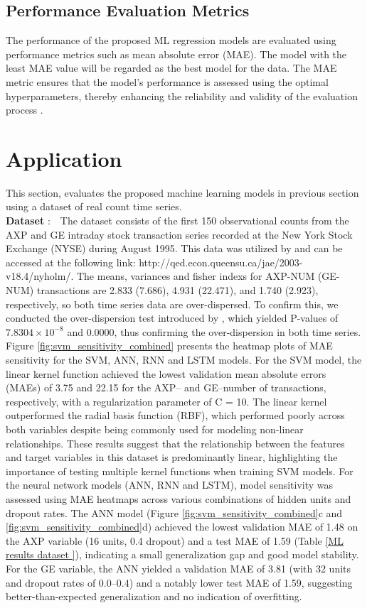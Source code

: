 \documentclass[twoside]{article}
\begin{document}
\subsection{Performance Evaluation Metrics} \label{Performance Evaluation Metrics}
The performance of the proposed ML regression models are evaluated using performance metrics such as  mean absolute error (MAE).
The model with the least MAE value will be regarded as the best model for the data. The MAE metric ensures that the model’s performance is assessed using the optimal hyperparameters, thereby enhancing the reliability and validity of the evaluation process \cite{Alomair : 2024}.
\section{Application}%
This section,  evaluates the proposed machine learning models in previous section using   a dataset of real count time series.\\
{\bf Dataset }:~~The dataset consists of the first 150 observational counts from the AXP and GE intraday stock transaction series recorded at the New York Stock Exchange (NYSE) during August 1995. This data was utilized by \cite{Nyholm : 2003} and can be accessed at the following link: http://qed.econ.queensu.ca/jae/2003-v18.4/nyholm/. The means, variances  and fisher indexs for AXP-NUM (GE-NUM) transactions are 2.833 (7.686), 4.931 (22.471), and 1.740 (2.923), respectively, so both time series data are over-dispersed.  To confirm this, we conducted the over-dispersion test introduced by \cite{Schweer : 2014}, which yielded P-values of $7.8304 \times 10^{-8}$ and $0.0000$, thus confirming the over-dispersion in both time series.\\
Figure \ref{fig:svm_sensitivity_combined} presents the heatmap plots of MAE sensitivity for the SVM, ANN, RNN  and LSTM models. For the SVM model, the linear kernel function achieved the lowest validation mean absolute errors (MAEs) of 3.75 and 22.15 for the AXP– and GE–number of transactions, respectively, with a regularization parameter of C = 10. The linear kernel outperformed the radial basis function (RBF), which performed poorly across both variables despite being commonly used for modeling non-linear relationships. These results suggest that the relationship between the features and target variables in this dataset is predominantly linear, highlighting the importance of testing multiple kernel functions when training SVM models. For the neural network models (ANN, RNN  and LSTM), model sensitivity was assessed using MAE heatmaps across various combinations of hidden units and dropout rates. The ANN model (Figure \ref{fig:svm_sensitivity_combined}c and \ref{fig:svm_sensitivity_combined}d) achieved the lowest validation MAE of 1.48 on the AXP variable (16 units, 0.4 dropout) and a test MAE of 1.59 (Table \ref{ML results dataset }), indicating a small generalization gap and good model stability. For the GE variable, the ANN yielded a validation MAE of 3.81 (with 32 units and dropout rates of 0.0–0.4) and a notably lower test MAE of 1.59, suggesting better-than-expected generalization and no indication of overfitting. \\
\end{document}
